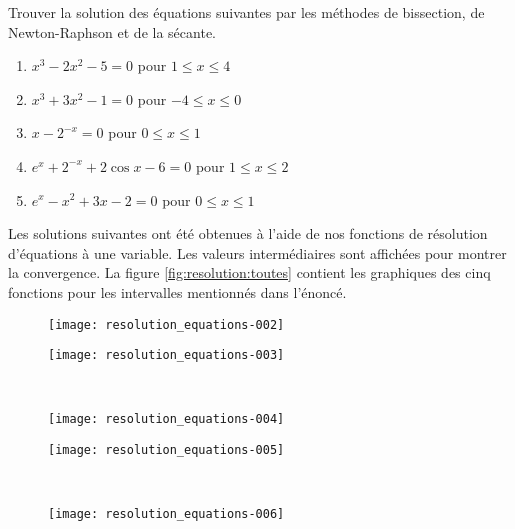 \begin{exercice}
  \label{ex:resolution:toutes}
  Trouver la solution des équations suivantes par les méthodes de
  bissection, de Newton-Raphson et de la sécante.
  \begin{enumerate}
  \item $x^3 - 2 x^2 - 5 = 0$ pour $1 \leq x \leq 4$
  \item $x^3 + 3 x^2 - 1 = 0$ pour $-4 \leq x \leq 0$
  \item $x - 2^{-x} = 0$ pour $0 \leq x \leq 1$
  \item $e^x + 2^{-x} + 2 \cos x - 6 = 0$ pour $1 \leq x \leq 2$
  \item $e^x - x^2 + 3x - 2 = 0$ pour $0 \leq x \leq 1$
  \end{enumerate}
  \begin{sol}
    Les solutions suivantes ont été obtenues à l'aide de nos fonctions
    de résolution d'équations à une variable. Les valeurs
    intermédiaires sont affichées pour montrer la convergence. La
    figure \ref{fig:resolution:toutes} contient les graphiques des cinq
    fonctions pour les intervalles mentionnés dans l'énoncé.
    \begin{figure}
      \centering
      \begin{minipage}{0.45\linewidth}
        \centering
\texttt{[image: resolution\_equations-002]}
      \end{minipage}
      \hfill
      \begin{minipage}{0.45\linewidth}
        \centering
\texttt{[image: resolution\_equations-003]}
      \end{minipage} \\
      \begin{minipage}{0.45\linewidth}
        \centering
\texttt{[image: resolution\_equations-004]}
      \end{minipage}
      \hfill
      \begin{minipage}{0.45\linewidth}
        \centering
\texttt{[image: resolution\_equations-005]}
      \end{minipage} \\
      \begin{minipage}{0.45\linewidth}
        \centering
\texttt{[image: resolution\_equations-006]}
      \end{minipage}

\end{figure}
\end{sol}
\end{exercice}
